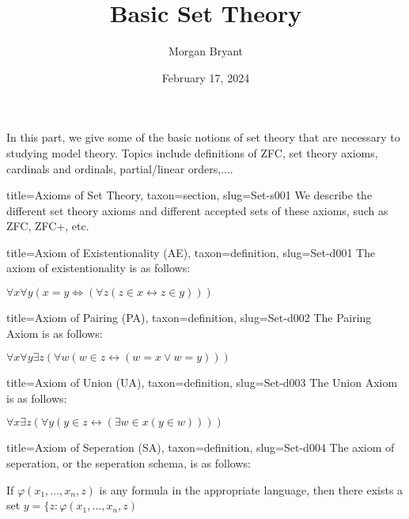 \documentclass[a4paper]{article}
\title{Basic Set Theory}
\date{February 17, 2024}
\author{Morgan Bryant}
\begin{document}
\maketitle
\par{In this part, we give some of the basic notions of set theory that are necessary to studying model theory. Topics include definitions of ZFC, set theory axioms, cardinals and ordinals, partial/linear orders,....}
\begin{tree}{title={Axioms of Set Theory}, taxon={section}, slug={Set-s001}}
We describe the different set theory axioms and different accepted sets of these axioms, such as ZFC, ZFC+, etc.
\begin{tree}{title={Axiom of Existentionality (AE)}, taxon={definition}, slug={Set-d001}}
The axiom of existentionality is as follows:\par{\(\forall  x  \forall  y( x = y  \Leftrightarrow  ( \forall  z (z \in  x  \leftrightarrow  z \in  y)))\)}
\end{tree}

\begin{tree}{title={Axiom of Pairing (PA)}, taxon={definition}, slug={Set-d002}}
The Pairing Axiom is as follows:\par{\(\forall  x  \forall  y  \exists  z ( \forall  w(w \in  z  \leftrightarrow  (w= x \lor  w=y)))\)}
\end{tree}

\begin{tree}{title={Axiom of Union (UA)}, taxon={definition}, slug={Set-d003}}
The Union Axiom is as follows:\par{\(\forall  x  \exists  z( \forall  y( y \in  z  \leftrightarrow  ( \exists  w  \in  x (y \in  w))))\)}
\end{tree}

\begin{tree}{title={Axiom of Seperation (SA)}, taxon={definition}, slug={Set-d004}}
The axiom of seperation, or the seperation schema, is as follows:\par{If \(\varphi (x_1, \dots , x_n,z)\) is any formula in the appropriate language, then there exists a set \( y =  \{ z:  \varphi (x_1, \dots , x_n, z)\)}
\end{tree}

\end{tree}

\printbibliography
\end{document}
